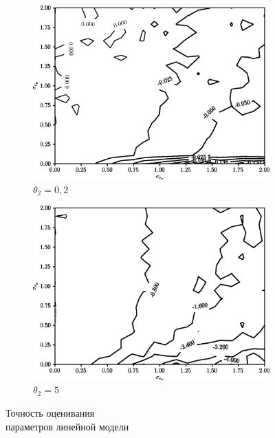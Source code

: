 \begin{figure}[p]
  \begin{subfigure}[b]{\linewidth}
    \centering
    \includegraphics[width=135mm]{fig/nonlinear/linear/beta-0,2.png}
    \caption{\( \theta_2 = 0{,}2 \)}
  \end{subfigure}

  \vspace{2\baselineskip}
  \begin{subfigure}[b]{\linewidth}
    \centering
    \includegraphics[width=135mm]{fig/nonlinear/linear/beta-5.png}
    \caption{\( \theta_2 = 5 \)}
  \end{subfigure}

  \vspace{\baselineskip}
  \caption{%
    Точность оценивания \\
    параметров линейной модели
  }\label{fig:comparison_nonlinear_linear}
\end{figure}

